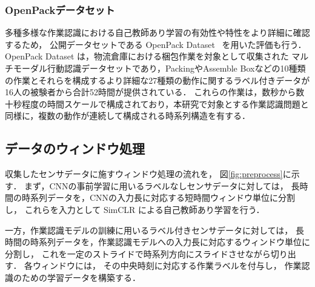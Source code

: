 \documentclass[submit]{ipsj}
\newcommand{\rev}[1]{{\color{red}#1}}
\begin{document}
{\subsubsection{OpenPackデータセット}
\rev{多種多様な作業認識における自己教師あり学習の有効性や特性をより詳細に}確認するため，
公開データセットである OpenPack Dataset~\cite{yoshimura2024openpack} を用いた評価も行う．
OpenPack Dataset は，\rev{物流倉庫における梱包作業を対象として収集された}
マルチモーダル行動認識データセットであり，\rev{PackingやAssemble Boxなどの10種類の作業とそれらを構成するより詳細な27種類の動作}に関するラベル付きデータが16人の被験者から合計52時間が提供されている．
\rev{これらの作業は，数秒から数十秒程度の時間スケールで構成されており，本研究で対象とする作業認識問題と同様に，複数の動作が連続して構成される時系列構造を有する．}



\subsection{データのウィンドウ処理}
収集したセンサデータに施すウィンドウ処理の流れを，
図\ref{fig:preprocess}に示す．
まず，CNNの事前学習に用いるラベルなしセンサデータに対しては，
長時間の時系列データを，CNNの入力長に対応する短時間ウィンドウ単位に分割し，
これらを入力として SimCLR による自己教師あり学習を行う．

一方，作業認識モデルの訓練に用いるラベル付きセンサデータに対しては，
長時間の時系列データを，作業認識モデルへの入力長に対応するウィンドウ単位に分割し，
これを一定のストライドで時系列方向にスライドさせながら切り出す．
各ウィンドウには，
その中央時刻に対応する作業ラベルを付与し，
作業認識のための学習データを構築する．


}
\end{document}
